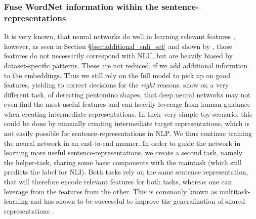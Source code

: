 \subsubsection{Fuse WordNet information within the sentence-representations}\label{sec:mt_learning_intro}
It is very known, that neural networks do well in learning relevant features \citep{bengio2013representation}, however, as seen in Section §\ref{sec:additional_snli_set} and shown by \cite{gururangan2018annotation}, those features do not necessarily correspond with \ac{NLU}, but are heavily biased by dataset-specific patterns. These are not reduced, if we add additional informtion to the embeddings. Thus we still rely on the full model to pick up on good features, yielding to correct decisions for the \textit{right} reasons. \cite{gulccehre2016knowledge} show on a very different task, of detecting pentomino shapes, that deep neural networks may not even find the most useful features and can heavily leverage from human guidance when creating intermediate representations. In their very simple toy-scenario, this could be done by manually creating intermediate target representations, which is not easily possible for sentence-representations in \ac{NLP}. We thus continue training the neural network in an end-to-end manner. In order to guide the network in learning more useful sentence-representations, we create a second task, namely the helper-task, sharing some basic components with the maintask (which still predicts the label for \ac{NLI}). Both tasks rely on the same sentence representation, that will therefore encode relevant features for both tasks, whereas one can leverage from the features from the other. This is commonly known as multitask-learning and has shown to be successful to improve the generalization of shared representations \citep{nangia2017repeval}.
